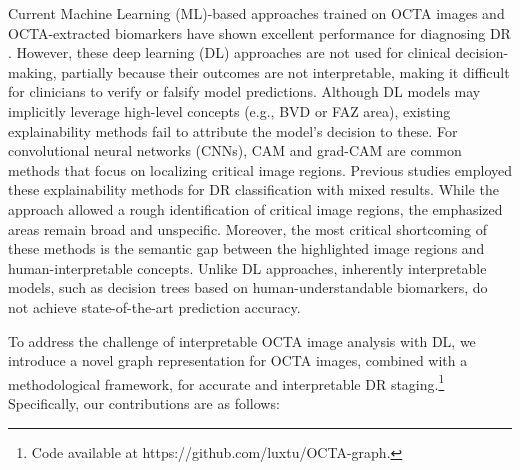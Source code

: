 Current Machine Learning (ML)-based approaches trained on OCTA images and OCTA-extracted biomarkers have shown excellent performance for diagnosing DR \cite{le2021machine, alam2019supervised, sandhu2020automated, alam2020quantitative, heisler2020ensemble, ryu2021deep, zang2022diabetic}. However, these deep learning (DL) approaches are not used for clinical decision-making, partially because their outcomes are not interpretable, making it difficult for clinicians to verify or falsify model predictions. Although DL models may implicitly leverage high-level concepts (e.g., BVD or FAZ area), existing explainability methods fail to attribute the model's decision to these. For convolutional neural networks (CNNs), CAM \cite{zhou2016learning} and grad-CAM \cite{selvaraju2017grad} are common methods that focus on localizing critical image regions. Previous studies \cite{heisler2020ensemble, ryu2021deep, zang2022diabetic} employed these explainability methods for DR classification with mixed results. While the approach allowed a rough identification of critical image regions, the emphasized areas remain broad and unspecific. Moreover, the most critical shortcoming of these methods is the semantic gap between the highlighted image regions and human-interpretable concepts. Unlike DL approaches, inherently interpretable models, such as decision trees based on human-understandable biomarkers, do not achieve state-of-the-art prediction accuracy.

To address the challenge of interpretable OCTA image analysis with DL, we introduce a novel graph representation for OCTA images, combined with a methodological framework, for accurate and interpretable DR staging.\footnote{Code available at https://github.com/luxtu/OCTA-graph.} Specifically, our contributions are as follows:

